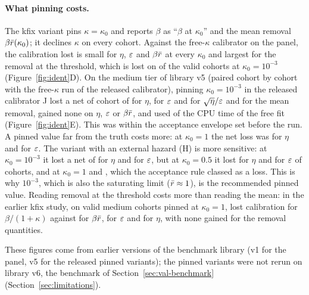 \paragraph{What pinning costs.} The kfix variant pins $\kappa=\kappa_0$ and reports $\beta$ as ``$\beta$ at $\kappa_0$'' and
the mean removal $\beta\bar r(\kappa_0)$; it declines $\kappa$ on every cohort. Against the free-$\kappa$ calibrator on
the panel, the calibration lost is small for $\eta$, $\varepsilon$ and $\beta\bar r$ at every $\kappa_0$ and largest for
the removal at the threshold, which is lost on  of the  valid cohorts at
$\kappa_0=10^{-3}$ (Figure~\ref{fig:ident}D). On the medium tier of library v5 (paired cohort by cohort with the free-$\kappa$ run of the
released calibrator), pinning $\kappa_0=10^{-3}$ in the
released calibrator J lost a net of  cohort of  for $\eta$,  for
$\varepsilon$ and  for $\sqrt\eta/\varepsilon$ and for the mean removal, gained none on $\eta$, $\varepsilon$ or $\beta\bar r$,
and used  of the CPU time of the free fit (Figure~\ref{fig:ident}E). This was within the
acceptance envelope set before the run. A pinned value far from the truth costs more: at $\kappa_0=1$ the
net loss was  for $\eta$ and  for $\varepsilon$. The variant with an external hazard
(H) is more sensitive: at $\kappa_0=10^{-3}$ it lost a net of  for $\eta$ and 
for $\varepsilon$, but at $\kappa_0=0.5$ it lost  for $\eta$ and  for $\varepsilon$ of 
cohorts, and at $\kappa_0=1$  and , which the acceptance rule classed as a loss. This
is why $10^{-3}$, which is also the saturating limit ($\bar r\approx1$), is the recommended pinned value. Reading removal at the threshold costs more than reading the mean:
in the earlier kfix study, on  valid medium cohorts pinned at $\kappa_0=1$,  lost calibration for $\beta/(1+\kappa)$
against  for $\beta\bar r$,  for $\varepsilon$ and  for $\eta$, with
none gained for the removal quantities.

These figures come from earlier versions of the benchmark library (v1 for the panel, v5 for the released pinned
variants); the pinned variants were not rerun on library v6, the benchmark of Section~\ref{sec:val-benchmark}
(Section~\ref{sec:limitations}).

